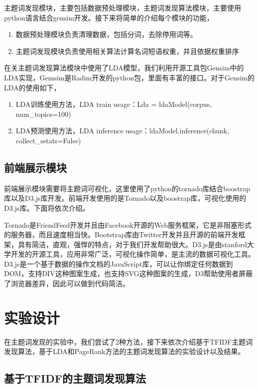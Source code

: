 \documentclass[master]{njuthesis}
\begin{document}
    主题词发现模块，主要包括数据预处理模块，主题词发现算法模块，主要使用python语言结合gensim开发。接下来将简单的介绍每个模块的功能，
\begin{enumerate}
\item 数据预处理模块负责清理数据，包括分词，去除停用词等。
\item 主题词发现模块负责使用相关算法计算名词短语权重，并且依据权重排序
\end{enumerate}

    在关主题词发现算法模块中使用了LDA模型，我们利用开源工具包Gensim中的LDA实现，Gemsim是Radim开发的python包，里面有丰富的接口。对于Gensim的LDA的使用如下，
\begin{enumerate}
\item LDA训练使用方法，LDA train usage：Lda = ldaModel(corpus, num\_topics=100)
\item LDA预测使用方法，LDA inference usage：ldaModel.inference(chunk, collect\_sstats=False)
\end{enumerate}

\subsection{前端展示模块}

    前端展示模块需要将主题词可视化，这里使用了python的tornado库结合boostrap库以及D3.js库开发。前端开发使用的是Tornado以及boostrap库，可视化使用的D3.js库。下面将依次介绍。

    Tornado是FriendFeed开发并且由Facebook开源的Web服务框架，它是非阻塞形式的服务器，而且速度相当快。Bootstrap库由Twitter开发并且开源的前端开发框架，具有简洁，直观，强悍的特点，对于我们开发帮助很大。D3.js是由stanford大学开发的开源工具，应用非常广泛，可视化操作简单，是主流的数据可视化工具。D3.js是一个基于数据的操作文档的JavaScript库，可以让你绑定任何数据到DOM，支持DIV这种图案生成，也支持SVG这种图案的生成，D3帮助使用者屏蔽了浏览器差异，因此可以做到代码简洁。


\section{实验设计}
 
    在主题词发现的实验中，我们尝试了2种方法，接下来依次介绍基于TFIDF主题词发现算法，基于LDA和PageRank方法的主题词发现算法的实验设计以及结果。

\subsection{基于TFIDF的主题词发现算法}
\end{document}
